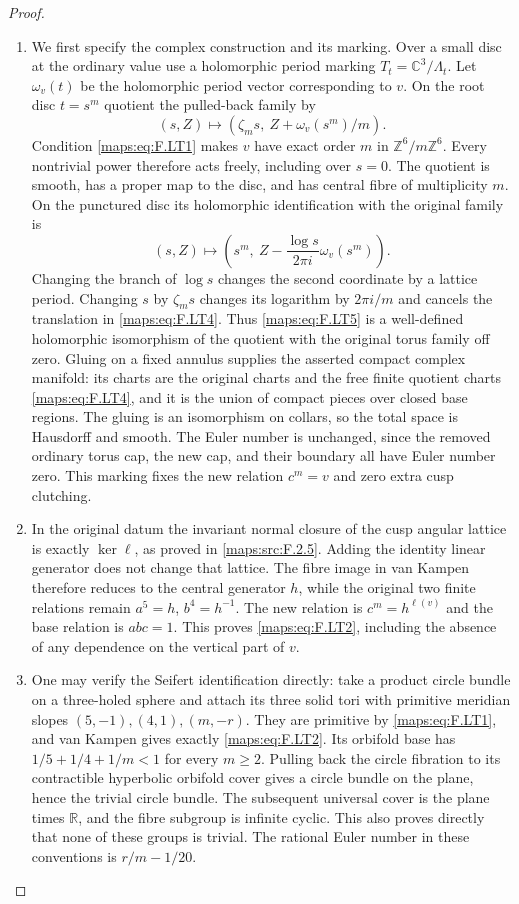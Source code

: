 \begin{proof}
\begin{enumerate}[label=\arabic*.]
\item We first specify the complex construction and its marking.
Over a small disc at the ordinary value use a holomorphic
period marking
$T_t=\mathbb C^3/\Lambda_t$.
Let $\omega_v(t)$ be the holomorphic period vector
corresponding to $v$.
On the root disc $t=s^m$ quotient the pulled-back family by
\[
 (s,Z)\longmapsto
   (\zeta_m s,\ Z+\omega_v(s^m)/m).
\tag{F.LT4}\label{maps:eq:F.LT4}
\]
Condition \eqref{maps:eq:F.LT1} makes $v$ have exact order $m$
in $\mathbb Z^6/m\mathbb Z^6$.
Every nontrivial power therefore acts freely, including
over $s=0$.
The quotient is smooth, has a proper map to the disc,
and has central fibre of multiplicity $m$.
On the punctured disc its holomorphic identification with
the original family is
\[
 (s,Z)\longmapsto
 \left(s^m,\ Z-\frac{\log s}{2\pi i}\omega_v(s^m)\right).
\tag{F.LT5}\label{maps:eq:F.LT5}
\]
Changing the branch of $\log s$ changes the second
coordinate by a lattice period.
Changing $s$ by $\zeta_m s$ changes its logarithm by
$2\pi i/m$ and cancels the translation in \eqref{maps:eq:F.LT4}.
Thus \eqref{maps:eq:F.LT5} is a well-defined holomorphic isomorphism
of the quotient with the original torus family off zero.
Gluing on a fixed annulus supplies the asserted compact
complex manifold: its charts are the original charts
and the free finite quotient charts \eqref{maps:eq:F.LT4}, and it is
the union of compact pieces over closed base regions.
The gluing is an isomorphism on collars, so the total
space is Hausdorff and smooth.
The Euler number is unchanged, since the removed
ordinary torus cap, the new cap, and their boundary
all have Euler number zero.
This marking fixes the new relation $c^m=v$ and
zero extra cusp clutching.

\item In the original datum the invariant normal closure
of the cusp angular lattice is exactly $\ker\ell$,
as proved in \ref{maps:src:F.2.5}.
Adding the identity linear generator does not change
that lattice.
The fibre image in van Kampen therefore reduces to
the central generator $h$, while the original two
finite relations remain $a^5=h$, $b^4=h^{-1}$.
The new relation is $c^m=h^{\ell(v)}$ and the base
relation is $abc=1$.
This proves \eqref{maps:eq:F.LT2}, including the absence of any
dependence on the vertical part of $v$.

\item One may verify the Seifert identification directly:
take a product circle bundle on a three-holed sphere
and attach its three solid tori with primitive meridian
slopes $(5,-1),(4,1),(m,-r)$.
They are primitive by \eqref{maps:eq:F.LT1}, and van Kampen gives
exactly \eqref{maps:eq:F.LT2}.
Its orbifold base has
$1/5+1/4+1/m<1$ for every $m\ge2$.
Pulling back the circle fibration to its contractible
hyperbolic orbifold cover gives a circle bundle on
the plane, hence the trivial circle bundle.
The subsequent universal cover is the plane times
$\mathbb R$, and the fibre subgroup is infinite cyclic.
This also proves directly that none of these groups
is trivial.
The rational Euler number in these conventions is
$r/m-1/20$.


\end{enumerate}
\end{proof}
